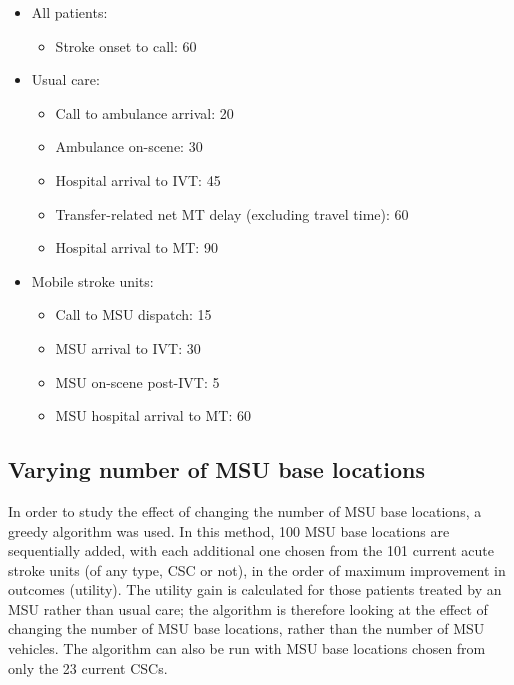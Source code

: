 \begin{minipage}{1.0\textwidth}  %
\begin{itemize}
    \item All patients:
    \begin{itemize}
        \item Stroke onset to call: 60
    \end{itemize}
    \item Usual care:
    \begin{itemize}
        \item Call to ambulance arrival: 20
        \item Ambulance on-scene: 30
        \item Hospital arrival to IVT: 45
        \item Transfer-related net MT delay (excluding travel time): 60
        \item Hospital arrival to MT: 90
    \end{itemize}
    \item Mobile stroke units:
    \begin{itemize}
        \item Call to MSU dispatch: 15
        \item MSU arrival to IVT: 30
        \item MSU on-scene post-IVT: 5
        \item MSU hospital arrival to MT: 60
    \end{itemize}
\end{itemize}
\end{minipage}

\vspace{5mm}

\subsection{Varying number of MSU base locations}

In order to study the effect of changing the number of MSU base locations, a greedy algorithm was used. In this method, 100 MSU base locations are sequentially added, with each additional one chosen from the 101 current acute stroke units (of any type, CSC or not), in the order of maximum improvement in outcomes (utility). The utility gain is calculated for those patients treated by an MSU rather than usual care; the algorithm is therefore looking at the effect of changing the number of MSU base locations, rather than the number of MSU vehicles. The algorithm can also be run with MSU base locations chosen from only the 23 current CSCs.